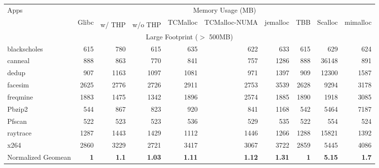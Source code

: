 \begin{table*}[tp]
\footnotesize
  \centering
    \begin{tabular}{|l|r|rr|rrrrrr|}
    \hline
    \multirow{3}{*}{Apps}&
    \multicolumn{9}{c|}{Memory Usage (MB)}\\
    \cline{2-10}
    &\multirow{2}{*}{Glibc}&\multicolumn{2}{c|}{\NM{}}&\multirow{2}{*}{TCMalloc}&\multirow{2}{*}{TCMalloc-NUMA}&\multirow{2}{*}{jemalloc}&\multirow{2}{*}{TBB}&\multirow{2}{*}{Scalloc}&\multirow{2}{*}{mimalloc} \\ \cline{3-4} 
    && w/ THP & w/o THP &&&&&& \\ \hline
    \hline
    \multicolumn{10}{|c|}{Large Footprint ($>$ 500MB)}\\ \hline
blackscholes&615&780&615&635&622&633&615&629&624\\ \hline
canneal&888&863&770&841&757&1286&888&36148&891\\ \hline
dedup&907&1163&1097&1081&971&1397&909&12300&1587\\ \hline
facesim&2625&2776&2726&2911&2753&3539&2628&9294&3178\\ \hline
freqmine&1883&1475&1342&1896&2574&1885&1890&1918&3085\\ \hline
Pbzip2&544&867&823&920&841&1168&542&5464&7187\\ \hline
Pfscan&522&523&523&536&529&535&522&554&524\\ \hline
raytrace&1287&1443&1429&1112&1446&1266&1288&15821&1392\\ \hline
x264&2860&3229&2721&3417&3067&3722&2859&5445&4086\\ \hline
\hline
Normalized Geomean &{\bf 1}&{\bf 1.1}&{\bf 1.03}&{\bf 1.11}&{\bf 1.12}&{\bf 1.31}&{\bf 1}&{\bf 5.15}&{\bf 1.7}\\ \hline


\end{tabular}
\end{table*}
